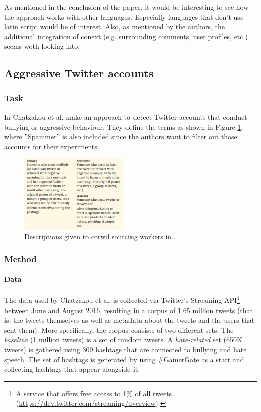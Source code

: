 \documentclass{proseminar}
\begin{document}
As mentioned in the conclusion of the paper, it would be interesting to see how the approach works with other languages. Especially languages that don't use latin script would be of interest. Also, as mentioned by the authors, the additional integration of conext (e.g. surrounding comments, user profiles, etc.) seems woth looking into.

\subsection{Aggressive Twitter accounts}
\subsubsection{Task}
In \cite{Twitter:2017} Chatzakou et al. make an approach to detect Twitter accounts that conduct bullying or aggressive behaviour. They define the terms as shown in Figure \ref{fig:twitter_defs}, where ''Spammer'' is also included since the authors want to filter out those accounts for their experiments.

\begin{figure}
\centering
\includegraphics[width=0.47\textwidth]{img/twitter_defs}
\caption{Descriptions given to corwd sourcing workers in \cite{Twitter:2017}.}
\label{fig:twitter_defs}
\end{figure}

\subsubsection{Method}
\paragraph{Data} The data used by Chatzakou et al. is collected via Twitter's Streaming API\footnote{A service that offers free access to 1\% of all tweets (\url{https://dev.twitter.com/streaming/overview}).} between June and August 2016, resulting in a corpus of 1.65 million tweets (that is, the tweets themselves as well as metadata about the tweets and the users that sent them). More specifically, the corpus consists of two different sets. The \emph{baseline} (1 million tweets) is a set of random tweets. A \emph{hate-related} set (650K tweets) is gathered using 309 hashtags that are connected to bullying and hate speech. The set of hashtags is generated by using \#GamerGate as a start and collecting hashtags that appear alongside it.
\end{document}
